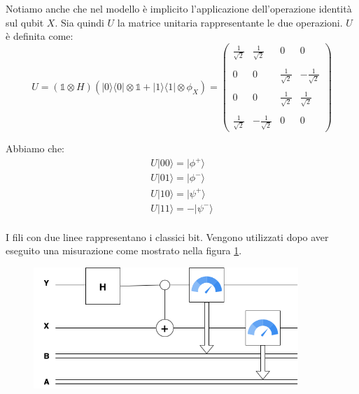 Notiamo anche che nel modello è implicito l'applicazione dell'operazione identità sul qubit $X$. Sia quindi
$U$ la matrice unitaria rappresentante le due operazioni. $U$ è definita come:
\begin{equation*}
    U = \left(\mathbb{1} \otimes H \right)\left(|0\rangle\langle0| \otimes \mathbb{1} + |1\rangle\langle1| \otimes \phi_X\right) = 
    \left(\begin{array}{cccc}
        \frac{1}{\sqrt{2}} & \frac{1}{\sqrt{2}} & 0 & 0 \\ \\
       0 & 0 & \frac{1}{\sqrt{2}} & - \frac{1}{\sqrt{2}} \\ \\
       0 & 0 & \frac{1}{\sqrt{2}} & \frac{1}{\sqrt{2}} \\ \\
        \frac{1}{\sqrt{2}} & -\frac{1}{\sqrt{2}} & 0 & 0 
    \end{array}\right)
\end{equation*}

Abbiamo che:
\begin{equation*}
    \begin{array}{l}
        U|00\rangle = |\phi^+\rangle \\
        U|01\rangle = |\phi^-\rangle \\
        U|10\rangle = |\psi^+\rangle \\
        U|11\rangle = -|\psi^-\rangle \\
    \end{array}
\end{equation*}

I fili con due linee rappresentano i classici bit. Vengono utilizzati dopo aver eseguito una misurazione
come mostrato nella figura \ref{fig5}.

\begin{figure}[h]
    \centering
    \includegraphics[width = 10cm]{./Images/MES.png}
    \caption{}
    \label{fig5}
\end{figure}

